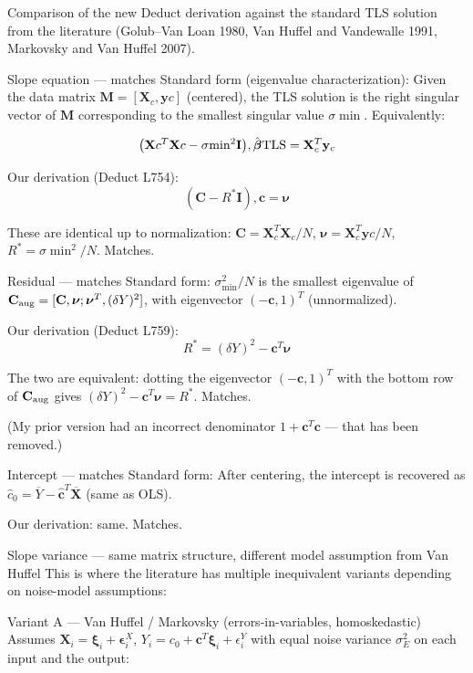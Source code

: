 \documentclass[twoside]{article}
\numberwithin{equation}{section}
\begin{document}
Comparison of the new Deduct derivation against the standard TLS solution from the literature (Golub–Van Loan 1980, Van Huffel and Vandewalle 1991, Markovsky and Van Huffel 2007).

Slope equation — matches
Standard form (eigenvalue characterization):
Given the data matrix $\mathbf{M} = [\mathbf{X}_c, \mathbf{y}c]$ (centered), the TLS solution is the right singular vector of $\mathbf{M}$ corresponding to the smallest singular value $\sigma{\min}$. Equivalently:

$$\big( \mathbf{X}c^T \mathbf{X}c - \sigma{\min}^2 \mathbf{I} \big), \hat{\boldsymbol\beta}{\rm TLS} = \mathbf{X}_c^T \mathbf{y}_c$$

Our derivation (Deduct L754):
$$(\mathbf{C} - R^* \mathbf{I}), \mathbf{c} = \boldsymbol\nu$$

These are identical up to normalization: $\mathbf{C} = \mathbf{X}_c^T\mathbf{X}_c/N$, $\boldsymbol\nu = \mathbf{X}_c^T\mathbf{y}c/N$, $R^* = \sigma{\min}^2/N$.  Matches.

Residual — matches
Standard form: $\sigma_{\min}^2/N$ is the smallest eigenvalue of $\mathbf{C}_{\rm aug} = [\mathbf{C}, \boldsymbol\nu; \boldsymbol\nu^T, (\delta Y)^2]$, with eigenvector $(-\mathbf{c}, 1)^T$ (unnormalized).

Our derivation (Deduct L759):
$$R^* = (\delta Y)^2 - \mathbf{c}^T \boldsymbol\nu$$

The two are equivalent: dotting the eigenvector $(-\mathbf{c}, 1)^T$ with the bottom row of $\mathbf{C}_{\rm aug}$ gives $(\delta Y)^2 - \mathbf{c}^T \boldsymbol\nu = R^*$.  Matches.

(My prior version had an incorrect denominator $1 + \mathbf{c}^T\mathbf{c}$ — that has been removed.)

Intercept — matches
Standard form: After centering, the intercept is recovered as $\hat{c}_0 = \overline{Y} - \hat{\mathbf{c}}^T \overline{\mathbf{X}}$ (same as OLS).

Our derivation: same.  Matches.

Slope variance — same matrix structure, different model assumption from Van Huffel
This is where the literature has multiple inequivalent variants depending on noise-model assumptions:

Variant A — Van Huffel / Markovsky (errors-in-variables, homoskedastic)
Assumes $\mathbf{X}_i = \boldsymbol\xi_i + \boldsymbol\epsilon_i^X$, $Y_i = c_0 + \mathbf{c}^T \boldsymbol\xi_i + \epsilon_i^Y$ with equal noise variance $\sigma_E^2$ on each input and the output:
\end{document}
